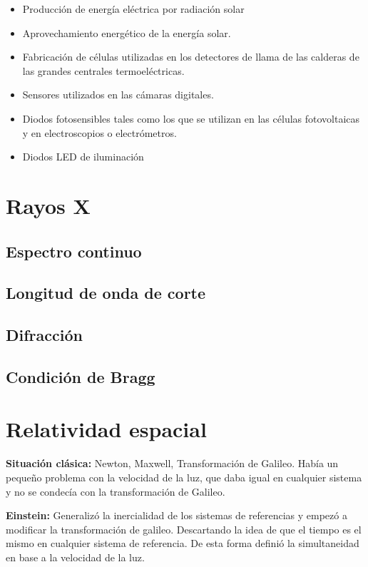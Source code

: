 \documentclass[oneside]{book}
\numberwithin{equation}{section}
\numberwithin{figure}{section}
\numberwithin{table}{section}
\begin{document}
				\begin{itemize}
					\item Producción de energía eléctrica por radiación solar
					\item Aprovechamiento energético de la energía solar. 
					\item Fabricación de células utilizadas en los detectores de llama de las calderas de las grandes centrales termoeléctricas.
					\item Sensores utilizados en las cámaras digitales. 
					\item Diodos fotosensibles tales como los que se utilizan en las células fotovoltaicas y en electroscopios o electrómetros.
					\item Diodos LED de iluminación
				\end{itemize}										
			
		\section{Rayos X}
			\subsection{Espectro continuo}
			\subsection{Longitud de onda de corte}
			\subsection{Difracción}	
			\subsection{Condición de Bragg}
		\section{Relatividad espacial}
		
		\textbf{Situación clásica:} Newton, Maxwell, Transformación de Galileo. Había un pequeño problema con la velocidad de la luz, que daba igual en cualquier sistema y no se condecía con la transformación de Galileo.

		\textbf{Einstein:} Generalizó la inercialidad de los sistemas de referencias y empezó a modificar la transformación de galileo. Descartando la idea de que el tiempo es el mismo en cualquier sistema de referencia. De esta forma definió la simultaneidad en base a la velocidad de la luz.
\end{document}
